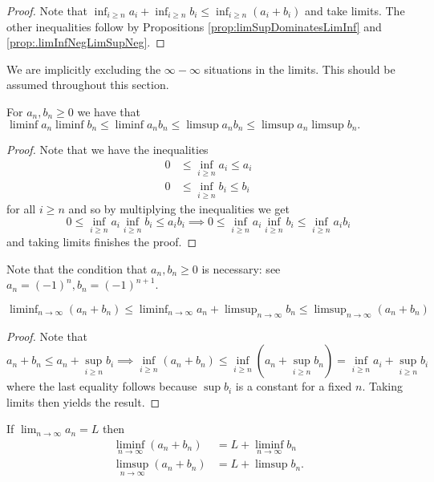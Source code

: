\begin{proof}
Note that $\inf_{i\geq n}a_{i}+\inf_{i\geq n}b_{i}\leq\inf_{i\geq n}\left(a_{i}+b_{i}\right)$
and take limits. The other inequalities follow by Propositions \ref{prop:limSupDominatesLimInf}
and \ref{prop:.limInfNegLimSupNeg}.
\end{proof}
\begin{rem*}
We are implicitly excluding the $\infty-\infty$ situations in the
limits. This should be assumed throughout this section.
\end{rem*}
\begin{prop}
\label{prop:prodLimInf}For $a_{n},b_{n}\geq0$ we have that $\liminf a_{n}\liminf b_{n}\leq\liminf a_{n}b_{n}\leq\limsup a_{n}b_{n}\leq\limsup a_{n}\limsup b_{n}.$
\end{prop}

\begin{proof}
Note that we have the inequalities 
\begin{align*}
0 & \leq\inf_{i\geq n}a_{i}\leq a_{i}\\
0 & \leq\inf_{i\geq n}b_{i}\leq b_{i}
\end{align*}
for all $i\geq n$ and so by multiplying the inequalities we get 
\[
0\leq\inf_{i\geq n}a_{i}\inf_{i\geq n}b_{i}\leq a_{i}b_{i}\implies0\leq\inf_{i\geq n}a_{i}\inf_{i\geq n}b_{i}\leq\inf_{i\geq n}a_{i}b_{i}
\]
and taking limits finishes the proof.
\end{proof}
\begin{rem}
Note that the condition that $a_{n},b_{n}\geq0$ is necessary: see
$a_{n}=\left(-1\right)^{n},b_{n}=(-1)^{n+1}$.
\end{rem}

\begin{prop}
\label{prop:limInfMid}$\liminf_{n\to\infty}\left(a_{n}+b_{n}\right)\leq\liminf_{n\to\infty}a_{n}+\limsup_{n\to\infty}b_{n}\leq\limsup_{n\to\infty}\left(a_{n}+b_{n}\right)$
\end{prop}

\begin{proof}
Note that 
\[
a_{n}+b_{n}\leq a_{n}+\sup_{i\geq n}b_{i}\implies\inf_{i\geq n}\left(a_{n}+b_{n}\right)\leq\inf_{i\geq n}\left(a_{n}+\sup_{i\geq n}b_{n}\right)=\inf_{i\geq n}a_{i}+\sup_{i\geq n}b_{i}
\]
where the last equality follows because $\sup b_{i}$ is a constant
for a fixed $n.$ Taking limits then yields the result.
\end{proof}
\begin{prop}
\label{prop:sumLimInfLim}If $\lim_{n\to\infty}a_{n}=L$ then 
\begin{align*}
\liminf_{n\to\infty}\left(a_{n}+b_{n}\right) & =L+\liminf_{n\to\infty}b_{n}\\
\limsup_{n\to\infty}\left(a_{n}+b_{n}\right) & =L+\limsup b_{n}.
\end{align*}
\end{prop}

